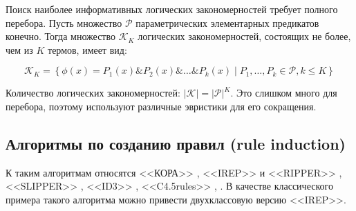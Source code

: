 \documentclass[12pt]{article}
\begin{document}
Поиск наиболее информативных логических закономерностей требует
полного перебора. Пусть множество \(\mathcal{P}\) параметрических
элементарных предикатов конечно. Тогда множество \(\mathcal{K}_K\)
логических закономерностей, состоящих не более, чем из \(K\) термов,
имеет вид:

\[
\mathcal{K}_K =
\left\{
 \phi(x) = P_1(x) \& P_2(x) \& \dots \& P_k(x) \mid
  P_1, \dots, P_k \in \mathcal{P}, k \leq K
\right\}
\]

Количество логических закономерностей: \(\lvert \mathcal{K} \rvert =
\lvert \mathcal{P} \rvert^{K}\). Это слишком много для перебора,
поэтому используют различные эвристики для его сокращения.



\subsection{Алгоритмы по созданию правил (rule induction)}

К таким алгоритмам относятся <<КОРА>> \cite{vainzvaig73kora}, <<IREP>>
и <<RIPPER>> \cite{cohen95fast}, <<SLIPPER>> \cite{cohen99simple},
<<ID3>> \cite{quinlan86induction}, <<C4.5rules>>
\cite{quinlan93programs}, \cite{quinlan96bagging}.  В качестве
классического примера такого алгоритма можно привести двухклассовую
версию <<IREP>>.
\end{document}
